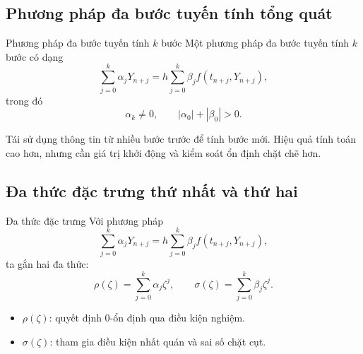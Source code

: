 \documentclass[aspectratio=43]{beamer}
\begin{document}
\subsection*{Phương pháp đa bước tuyến tính tổng quát}
\begin{frame}
\begin{baitapbox}{Phương pháp đa bước tuyến tính $k$ bước}
Một phương pháp đa bước tuyến tính $k$ bước có dạng
\[
 \sum_{j=0}^{k}\alpha_jY_{n+j}
 =h\sum_{j=0}^{k}\beta_j f(t_{n+j},Y_{n+j}),
\]
trong đó
\[
 \alpha_k\ne 0,\qquad |\alpha_0|+|\beta_0|>0.
\]
\end{baitapbox}
\begin{tcolorbox}[title={Ý tưởng}, colback=softgreen, colframe=tealgreen, colbacktitle=tealgreen]
Tái sử dụng thông tin từ nhiều bước trước để tính bước mới. Hiệu quả tính toán cao hơn, nhưng cần giá trị khởi động và kiểm soát ổn định chặt chẽ hơn.
\end{tcolorbox}
\end{frame}
\subsection*{Đa thức đặc trưng thứ nhất và thứ hai}
\begin{frame}
\begin{baitapbox}{Đa thức đặc trưng}
Với phương pháp
\[
 \sum_{j=0}^{k}\alpha_jY_{n+j}=h\sum_{j=0}^{k}\beta_j f(t_{n+j},Y_{n+j}),
\]
ta gắn hai đa thức:
\[
 \rho(\zeta)=\sum_{j=0}^{k}\alpha_j\zeta^j,
 \qquad
 \sigma(\zeta)=\sum_{j=0}^{k}\beta_j\zeta^j.
\]
\end{baitapbox}
\begin{itemize}
  \item $\rho(\zeta)$: quyết định 0-ổn định qua điều kiện nghiệm.
  \item $\sigma(\zeta)$: tham gia điều kiện nhất quán và sai số chặt cụt.
\end{itemize}
\end{frame}
\end{document}
